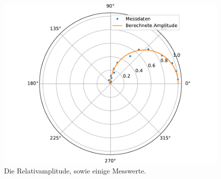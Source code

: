 \begin{figure}
  \centering
  \includegraphics{content/data_d_ausgleich.pdf}
  \caption{Die Relativamplitude, sowie einige Messwerte.}
  \label{fig:data_d}
\end{figure}
%
%
%
%
%
%
%